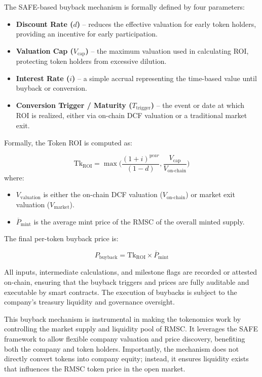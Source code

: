 \documentclass[conference]{IEEEtran}
\begin{document}
The SAFE-based buyback mechanism is formally defined by four parameters:

\begin{itemize}
    \item \textbf{Discount Rate (\(d\))} – reduces the effective valuation for early token holders, providing an incentive for early participation.
    \item \textbf{Valuation Cap (\(V_\text{cap}\))} – the maximum valuation used in calculating ROI, protecting token holders from excessive dilution.
    \item \textbf{Interest Rate (\(i\))} – a simple accrual representing the time-based value until buyback or conversion.
    \item \textbf{Conversion Trigger / Maturity (\(T_\text{trigger}\))} – the event or date at which ROI is realized, either via on-chain DCF valuation or a traditional market exit.
\end{itemize}

Formally, the Token ROI is computed as:

\begin{equation}
\mathrm{Tk_{ROI}} = \max\Big(   \frac{ (1 + i)^{year}}{ (1 - d)}  , \frac{ V_\text{cap}}{V_\text{on-chain}} \Big)
\end{equation}
where:

\begin{itemize}
    \item \(V_\text{valuation}\) is either the on-chain DCF valuation (\(V_\text{on-chain}\)) or market exit valuation (\(V_\text{market}\)).
    \item \(\overline{P}_\text{mint}\) is the average mint price of the RMSC of the overall minted supply.
\end{itemize}

The final per-token buyback price is:

\begin{equation}
P_\text{buyback} = \mathrm{Tk_{ROI}} \times \overline{P}_\text{mint}
\end{equation}

All inputs, intermediate calculations, and milestone flags are recorded or attested on-chain, ensuring that the buyback triggers and prices are fully auditable and executable by smart contracts. The execution of buybacks is subject to the company's treasury liquidity and governance oversight.

This buyback mechanism is instrumental in making the tokenomics work by controlling the market supply and liquidity pool of RMSC. It leverages the SAFE framework to allow flexible company valuation and price discovery, benefiting both the company and token holders. Importantly, the mechanism does not directly convert tokens into company equity; instead, it ensures liquidity exists that influences the RMSC token price in the open market.
\end{document}
